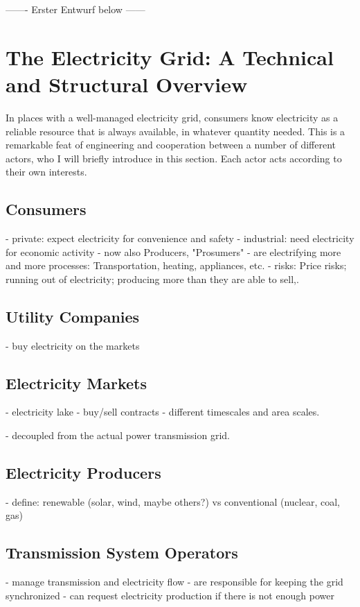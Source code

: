 ------- Erster Entwurf below ------

\section{The Electricity Grid: A Technical and Structural Overview}
In places with a well-managed electricity grid, consumers know electricity as a reliable resource that is always available, in whatever quantity needed.
This is a remarkable feat of engineering and cooperation between a number of different actors, who I will briefly introduce in this section.
Each actor acts according to their own interests.



\subsection{Consumers}
- private: expect electricity for convenience and safety
- industrial: need electricity for economic activity
- now also Producers, "Prosumers"
- are electrifying more and more processes: Transportation, heating, appliances, etc.
- risks: Price risks; running out of electricity; producing more than they are able to sell,.

\subsection{Utility Companies}
- buy electricity on the markets

\subsection{Electricity Markets}
- electricity lake
- buy/sell contracts
- different timescales and area scales.

- decoupled from the actual power transmission grid.

\subsection{Electricity Producers}
- define: renewable (solar, wind, maybe others?) vs conventional (nuclear, coal, gas)

\subsection{Transmission System Operators}
- manage transmission and electricity flow
- are responsible for keeping the grid synchronized
- can request electricity production if there is not enough power


